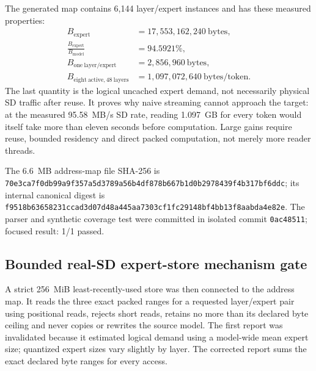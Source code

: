 The generated map contains 6{,}144 layer/expert instances and has these measured
properties:
\begin{align*}
  B_{\mathrm{expert}} &= 17{,}553{,}162{,}240\ \mathrm{bytes},\\
  \frac{B_{\mathrm{expert}}}{B_{\mathrm{model}}} &= 94.5921\%,\\
  B_{\mathrm{one\ layer/expert}} &= 2{,}856{,}960\ \mathrm{bytes},\\
  B_{\mathrm{eight\ active,48\ layers}} &= 1{,}097{,}072{,}640\ \mathrm{bytes/token}.
\end{align*}
The last quantity is the logical uncached expert demand, not necessarily physical
SD traffic after reuse.  It proves why naive streaming cannot approach the target:
at the measured 95.58~MB/s SD rate, reading 1.097~GB for every token would itself
take more than eleven seconds before computation.  Large gains require reuse,
bounded residency and direct packed computation, not merely more reader threads.

The 6.6~MB address-map file SHA-256 is
\texttt{70e3ca7f0db99a9f357a5d3789a56b4df878b667b1d0b2978439f4b317bf6ddc};
its internal canonical digest is
\texttt{f9518b63658231ccad3d07d48a445aa7303cf1fc29148bf4bb13f8aabda4e82e}.
The parser and synthetic coverage test were committed in isolated commit
\texttt{0ac48511}; focused result: 1/1 passed.

\subsection{Bounded real-SD expert-store mechanism gate}

A strict 256~MiB least-recently-used store was then connected to the address map.
It reads the three exact packed ranges for a requested layer/expert pair using
positional reads, rejects short reads, retains no more than its declared byte
ceiling and never copies or rewrites the source model.  The first report was
invalidated because it estimated logical demand using a model-wide mean expert
size; quantized expert sizes vary slightly by layer.  The corrected report sums
the exact declared byte ranges for every access.

